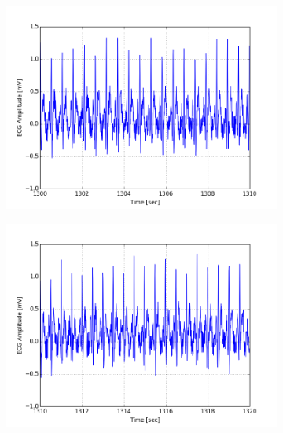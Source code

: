 \documentclass[paper=a4, fontsize=11pt]{scrartcl}
\numberwithin{equation}{section}		%
\numberwithin{figure}{section}			%
\numberwithin{table}{section}		    %
\begin{document}
\begin{appendices}
\begin{figure}[H]
	\centering
	\begin{subfigure}[b]{0.3\textwidth}
		\includegraphics[width=\textwidth]{sim/ecg_37}
	\end{subfigure}
	\begin{subfigure}[b]{0.3\textwidth}
		\includegraphics[width=\textwidth]{sim/ecg_38}
	\end{subfigure}
	\begin{subfigure}[b]{0.3\textwidth}

\end{subfigure}
\end{figure}
\end{appendices}
\end{document}
